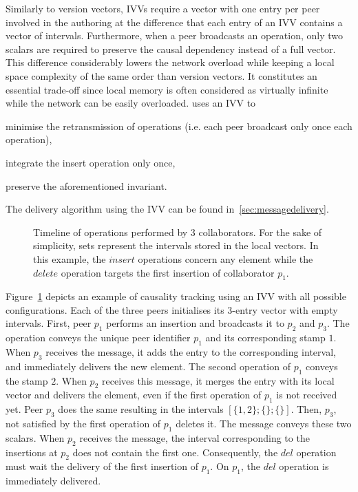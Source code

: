 Similarly to version vectors, IVVs require a vector with one entry per peer
involved in the authoring at the difference that each entry of an IVV contains
a vector of intervals. Furthermore, when a peer broadcasts an operation, only
two scalars are required to preserve the causal dependency instead of a full
vector. This difference considerably lowers the network overload while keeping
a local space complexity of the same order than version vectors.  It
constitutes an essential trade-off since local memory is often considered as
virtually infinite while the network can be easily overloaded. \CRATE
uses an IVV to
\begin{inparaenum}[(i)]
\item minimise the retransmission of operations (i.e. each peer broadcast only
  once each operation),
\item integrate the insert operation only once,
\item preserve the aforementioned invariant.
\end{inparaenum}
The delivery algorithm using the IVV can be found in~\ref{sec:messagedelivery}.

\begin{figure}
  \centering 
  \caption{\label{fig:timelineexample}Timeline of operations performed by 3
    collaborators. For the sake of simplicity, sets represent the intervals
    stored in the local vectors. In this example, the $insert$ operations
    concern any element while the $delete$ operation targets the first
    insertion of collaborator $p_1$.}
\end{figure}

Figure~\ref{fig:timelineexample} depicts an example of causality tracking using
an IVV with all possible configurations. Each of the three peers initialises
its 3-entry vector with empty intervals. First, peer $p_1$ performs an
insertion and broadcasts it to $p_2$ and $p_3$. The operation conveys the
unique peer identifier $p_1$ and its corresponding stamp $1$. When $p_3$
receives the message, it adds the entry to the corresponding interval, and
immediately delivers the new element. The second operation of $p_1$ conveys the
stamp $2$. When $p_2$ receives this message, it merges the entry with its local
vector and delivers the element, even if the first operation of $p_1$ is not
received yet. Peer $p_3$ does the same resulting in the intervals
$[\{1,2\};\{\};\{\}]$. Then, $p_3$, not satisfied by the first operation of
$p_1$ deletes it. The message conveys these two scalars. When $p_2$ receives
the message, the interval corresponding to the insertions at $p_2$ does not
contain the first one. Consequently, the $del$ operation must wait the delivery
of the first insertion of $p_1$. On $p_1$, the $del$ operation is immediately
delivered.

